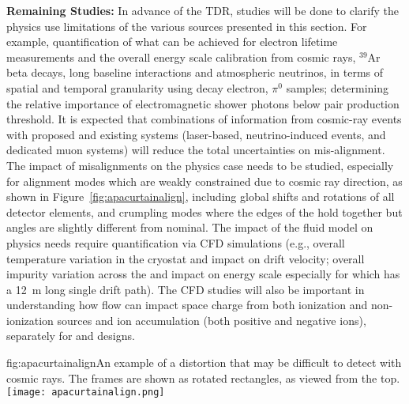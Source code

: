 \textbf{Remaining Studies:} In advance of the TDR, studies will be done to clarify the physics use limitations of the various sources presented in this section. %
For example, quantification of what can be achieved for  electron lifetime measurements and the overall energy scale calibration from cosmic rays,  ${}^{39}$Ar beta decays, long baseline interactions and atmospheric neutrinos, in terms of spatial and temporal granularity using decay electron, $\pi^0$ samples; determining the relative importance of electromagnetic shower photons below pair production threshold. It is expected that combinations of information from cosmic-ray events with proposed and existing systems (laser-based, neutrino-induced events, and dedicated muon systems) will reduce the total uncertainties on mis-alignment.  The impact of misalignments on the physics case needs to be studied, especially for alignment modes which are weakly constrained due to cosmic ray direction, as shown in Figure~\ref{fig:apacurtainalign}, including global shifts and rotations of all detector elements, and crumpling modes where the edges of the  hold together but angles are slightly different from nominal. The impact of the fluid model on physics needs require quantification via CFD simulations (e.g., overall temperature variation in the cryostat and impact on drift velocity; overall impurity variation across the \detmodule and impact on energy scale especially for  which has a \SI{12}{\m} long single drift path). The CFD studies will also be important in understanding how \lar flow can impact space charge from both ionization and non-ionization sources and ion accumulation (both positive and negative ions), separately for  and  designs. %

\begin{dunefigure}{fig:apacurtainalign}{An example of a distortion that may be difficult to detect with cosmic rays.  The  frames are shown as
rotated rectangles, as viewed from the top.}
\texttt{[image: apacurtainalign.png]}
\end{dunefigure}

